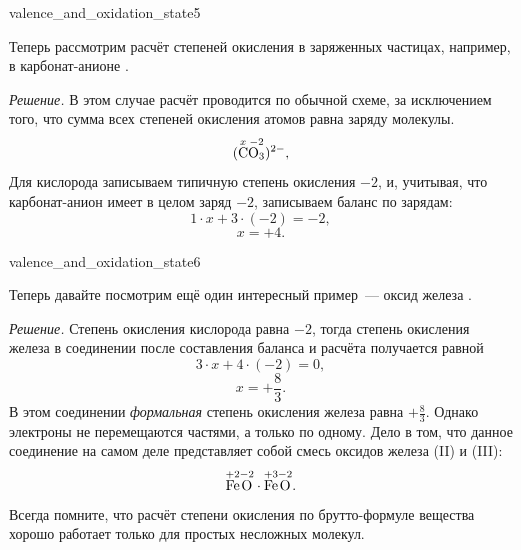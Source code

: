 \begin{example}{}{valence_and_oxidation_state5}
    \begin{condition}
        Теперь рассмотрим расчёт степеней окисления в заряженных частицах, например, в карбонат-анионе .
    \end{condition}

    \medskip

    \textit{Решение.} В этом случае расчёт проводится по обычной схеме, за исключением того, что сумма всех степеней окисления атомов равна заряду молекулы.
    \begin{equation*}
        (\overset{x}{\ce{C}}\overset{-2}{\ce{O3}})^{2-},
    \end{equation*}
    Для кислорода записываем типичную степень окисления $-2$, и, учитывая, что карбонат-анион имеет в целом заряд $-2$, записываем баланс по зарядам:
    \begin{equation*}
        1 \cdot x + 3 \cdot (-2) = -2,
    \end{equation*}
    \begin{equation*}
        x = +4.
    \end{equation*}
\end{example}

\begin{example}{}{valence_and_oxidation_state6}
    \begin{condition}
        Теперь давайте посмотрим ещё один интересный пример~--- оксид железа .
    \end{condition}

    \medskip

    \textit{Решение.} Степень окисления кислорода равна $-2$, тогда степень окисления железа в соединении после составления баланса и расчёта получается равной
    \begin{equation*}
        3 \cdot x + 4 \cdot (-2) = 0,
    \end{equation*}
    \begin{equation*}
        x = +\frac{8}{3}.
    \end{equation*}
    В этом соединении \emph{формальная} степень окисления железа равна $+\frac{8}{3}$. Однако электроны не перемещаются частями, а только по одному. Дело в том, что данное соединение на самом деле представляет собой смесь оксидов железа (II) и (III):
    \begin{equation*}
       \overset{+2}{\ce{Fe}}\overset{-2}{\ce{O}} \cdot \overset{+3}{\ce{Fe}}\overset{-2}{\ce{O}}.
    \end{equation*}
    Всегда помните, что расчёт степени окисления по брутто-формуле вещества хорошо работает только для простых несложных молекул.
\end{example}

